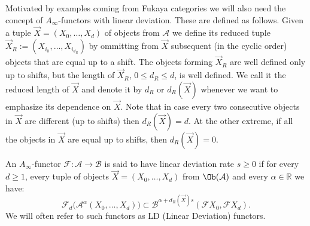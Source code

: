  Motivated by examples coming from Fukaya categories we will
  also need the concept of $A_{\infty}$-functors with linear
  deviation. These are defined as follows. Given a tuple
  $\vec{X} = (X_0, \ldots, X_d)$ of objects from $\mathcal{A}$ we
  define its reduced tuple
  $\vec{X}_R := (X_{i_0}, \ldots, X_{i_{d_R}})$ by ommitting from
  $\vec{X}$ subsequent (in the cyclic order) objects that are equal up
  to a shift. The objects forming $\vec{X}_R$ are well defined only up
  to shifts, but the length of $\vec{X}_R$,  $0 \leq d_R \leq d$, is well defined. We call it the reduced length
  of $\vec{X}$ and denote it by $d_R$ or $d_R(\vec{X})$ whenever we
  want to emphasize its dependence on $\vec{X}$. Note that in case
  every two consecutive objects in $\vec{X}$ are different (up to
  shifts) then $d_R(\vec{X}) = d$. At the other extreme, if all the
  objects in $\vec{X}$ are equal up to shifts, then
  $d_R(\vec{X}) = 0$.  

An $A_{\infty}$-functor
  $\mathcal{F}: \mathcal{A} \longrightarrow \mathcal{B}$ is said to
  have linear deviation rate $s \geq 0$ if for every $d \geq 1$, every
  tuple of objects $\vec{X} = (X_0, \ldots, X_d)$ from
  $\Ob(\mathcal{A})$ and every $\alpha \in \mathbb{R}$ we have:
$$\mathcal{F}_d \bigl(\mathcal{A}^{\alpha}(X_0, \ldots, X_d)\bigr)
\subset \mathcal{B}^{\alpha + d_R(\vec{X}) s}(\mathcal{F}X_0,
\mathcal{F}X_d).$$ We will often refer to such functors as LD (Linear
Deviation) functors.


